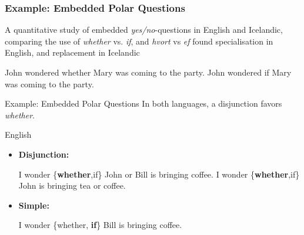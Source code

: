\documentclass[hyperref={pdfpagelabels=false}]{beamer}
\begin{document}

\begin{frame}
\frametitle{Example: Embedded Polar Questions}
A quantitative study of embedded \textsl{yes/no}-questions in English and Icelandic, comparing the use of \textsl{whether} vs. \textsl{if}, and \textsl{hvort} vs \textsl{ef} found specialisation in English, and replacement in Icelandic \citep{baileywallenbergwurff2012}
	\begin{exe}
		\ex John wondered whether Mary was coming to the party.
		\ex John wondered if Mary was coming to the party.
	\end{exe}
\end{frame}

\begin{frame}{Example: Embedded Polar Questions}
		In both languages, a disjunction favors {\it whether}.
	\begin{block}{English}
		\begin{itemize}
		\item[ ]\textbf{Disjunction:}
		\begin{exe}
			\ex I wonder \{{\bf whether},if\} John or Bill is bringing coffee.
			\ex I wonder \{{\bf whether},if\} John is bringing tea or coffee.
		\end{exe}
		\item[ ]\textbf{Simple:}
		\begin{exe}
			\ex I wonder \{whether, {\bf if}\} Bill is bringing coffee.
		\end{exe}
		\end{itemize}
	
	\end{block}
\end{frame}
\end{document}
